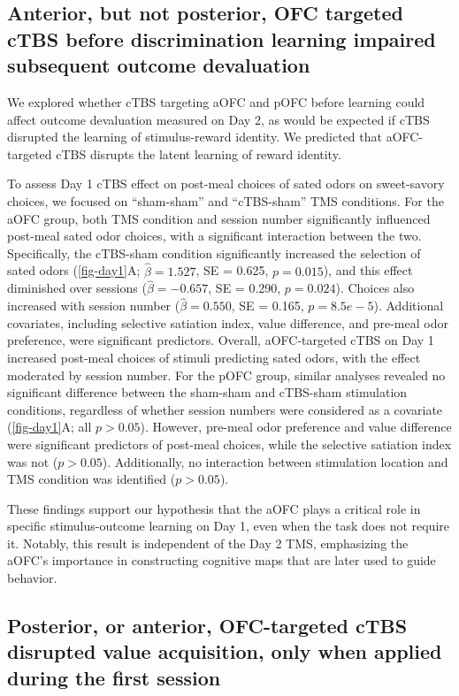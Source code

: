 \documentclass[lineno,sn-basic]{sn-jnl}%
\begin{document}
\subsection{Anterior, but not posterior, OFC targeted cTBS before discrimination learning impaired subsequent outcome devaluation}
\label{subsec-day1}

We explored whether cTBS targeting aOFC and pOFC before learning could affect outcome devaluation measured on Day 2, as would be expected if cTBS disrupted the learning of stimulus-reward identity. We predicted that aOFC-targeted cTBS disrupts the latent learning of reward identity.

To assess Day 1 cTBS effect on post-meal choices of sated odors on sweet-savory choices, we focused on ``sham-sham'' and ``cTBS-sham'' TMS conditions. For the aOFC group, both TMS condition and session number significantly influenced post-meal sated odor choices, with a significant interaction between the two. Specifically, the cTBS-sham condition significantly increased the selection of sated odors (\autoref{fig-day1}A; $\hat{\beta} = 1.527$, SE = 0.625, $p=0.015$), and this effect diminished over sessions ($\hat{\beta} = -0.657$, SE = 0.290, $p=0.024$). Choices also increased with session number ($\hat{\beta} = 0.550$, SE = 0.165, $p=8.5e-5$). Additional covariates, including selective satiation index, value difference, and pre-meal odor preference, were significant predictors. Overall, aOFC-targeted cTBS on Day 1 increased post-meal choices of stimuli predicting sated odors, with the effect moderated by session number. For the pOFC group, similar analyses revealed no significant difference between the sham-sham and cTBS-sham stimulation conditions, regardless of whether session numbers were considered as a covariate (\autoref{fig-day1}A; all $p>0.05$). However, pre-meal odor preference and value difference were significant predictors of post-meal choices, while the selective satiation index was not ($p>0.05$). Additionally, no interaction between stimulation location and TMS condition was identified ($p>0.05$). 


These findings support our hypothesis that the aOFC plays a critical role in specific stimulus-outcome learning on Day 1, even when the task does not require it. Notably, this result is independent of the Day 2 TMS, emphasizing the aOFC's importance in constructing cognitive maps that are later used to guide behavior. 


\subsection{Posterior, or anterior, OFC-targeted cTBS disrupted value acquisition, only when applied during the first session}
\label{subsec:disc}
\end{document}
